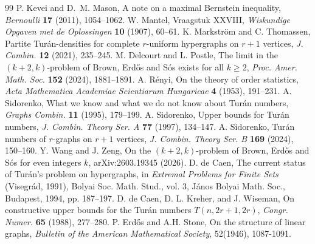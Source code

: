 \documentclass[10pt,a4paper]{amsart}
\numberwithin{equation}{section}
\begin{document}
\begin{thebibliography}{99}
 P. Kevei and D.~M. Mason, A note on a maximal Bernstein inequality, \emph{Bernoulli} \textbf{17} (2011), 1054--1062.
 W. Mantel, Vraagstuk XXVIII, \emph{Wiskundige Opgaven met de Oplossingen} \textbf{10} (1907), 60--61.
 K. Markstr\"om and C. Thomassen, Partite Tur\'an-densities for complete $r$-uniform hypergraphs on $r+1$ vertices, \emph{J. Combin.} \textbf{12} (2021), 235--245.
 M. Delcourt and L. Postle, The limit in the $(k+2, k)$-problem of Brown, Erdős and Sós exists for all $k \ge 2$, \emph{Proc. Amer. Math. Soc.} \textbf{152} (2024), 1881--1891.
 A. R\'enyi, On the theory of order statistics, \emph{Acta Mathematica Academiae Scientiarum Hungaricae} \textbf{4} (1953), 191--231.
 A. Sidorenko, What we know and what we do not know about Tur\'an numbers, \emph{Graphs Combin.} \textbf{11} (1995), 179--199.
 A. Sidorenko, Upper bounds for Tur\'an numbers, \emph{J. Combin. Theory Ser. A} \textbf{77} (1997), 134--147.
 A. Sidorenko, Tur\'an numbers of $r$-graphs on $r+1$ vertices, \emph{J. Combin. Theory Ser. B} \textbf{169} (2024), 150--160.
 Y. Wang and J. Zeng, On the $(k+2,k)$-problem of Brown, Erd\H{o}s and S\'os for even integers $k$, arXiv:2603.19345 (2026).
 D. de Caen, The current status of Tur\'an's problem on hypergraphs, in {\em Extremal Problems for Finite Sets} (Visegr\'ad, 1991), Bolyai Soc. Math. Stud., vol. 3, J\'anos Bolyai Math. Soc., Budapest, 1994, pp. 187--197.
 D. de Caen, D. L. Kreher, and J. Wiseman, On constructive upper bounds for the Tur\'an numbers $T(n,2r+1,2r)$, \emph{Congr. Numer.} \textbf{65} (1988), 277--280.
 P. Erd\H{o}s and A.H. Stone, On the structure of linear graphs, \emph{Bulletin of the American Mathematical Society}, 52(1946), 1087-1091.
\end{thebibliography}
\end{document}
